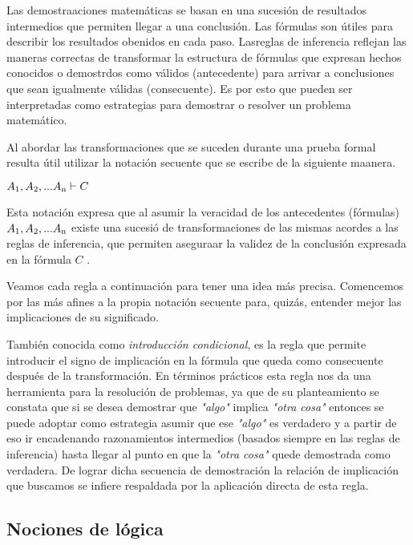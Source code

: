 Las demostraaciones matemáticas se basan en una sucesión de resultados intermedios que permiten llegar a una conclusión. Las fórmulas son útiles para describir los resultados obenidos en cada paso. Lasreglas de inferencia reflejan las maneras correctas de transformar la estructura de fórmulas que expresan hechos conocidos o demostrdos como válidos (antecedente) para arrivar a conclusiones que sean igualmente válidas (consecuente). Es por esto que pueden ser interpretadas como estrategias para demostrar o resolver un problema matemático.

Al abordar las transformaciones que se suceden durante una prueba formal resulta útil utilizar la notación secuente que se escribe de la siguiente maanera.

\begin{center}
$A\textsubscript{1}, A\textsubscript{2}, ... A\textsubscript{n} \vdash C$
\end{center}

Esta notación expresa que al asumir la veracidad de los antecedentes (fórmulas) $A\textsubscript{1}, A\textsubscript{2}, ... A\textsubscript{n}$ existe una sucesió de transformaciones de las mismas acordes a las reglas de inferencia, que permiten aseguraar la validez de la conclusión expresada en la fórmula $C$ .

Veamos cada regla a continuación para tener una idea más precisa. Comencemos por las más afines a la propia notación secuente para, quizás, entender mejor las implicaciones de su significado.



También conocida como \textit{introducción condicional}, es la regla que permite introducir el signo de implicación en la fórmula que queda como consecuente después de la transformación. En términos prácticos esta regla nos da una herramienta para la resolución de problemas, ya que de su planteamiento se constata que si se desea demostrar que \textit{"algo"} implica \textit{"otra cosa"} entonces se puede adoptar como estrategia asumir que ese \textit{"algo"} es verdadero y a partir de eso ir encadenando razonamientos intermedios (basados siempre en las reglas de inferencia) hasta llegar al punto en que la \textit{"otra cosa"} quede demostrada como verdadera. De lograr dicha secuencia de demostración la relación de implicación que buscamos se infiere respaldada por la aplicación directa de esta regla.


\subsection{Nociones de lógica}


